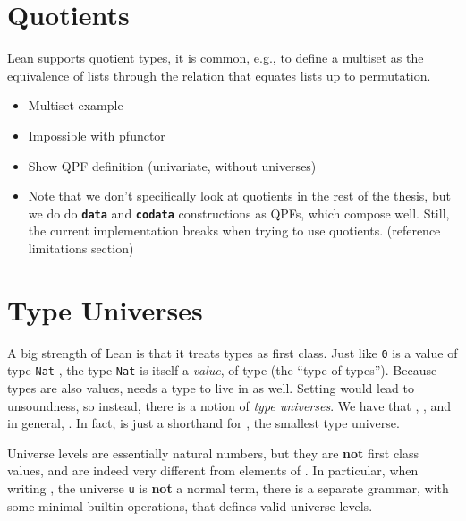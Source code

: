 \documentclass[titlepage]{report}
\newenvironment{todo}{%
\definecolor{shadecolor}{HTML}{F8E0E0}%
\begin{shaded}%
\begin{trivlist}                         
    \item[\hskip \labelsep {\bfseries Todo:}]}{\end{trivlist}\end{shaded}}
\newcommand\lean[1]{{%
\def\leanmode{1}%
\small \texttt{#1}%
\undef\leanmode%
}}
\newcommand\keyword[1]{{\color{keywordcolor} \textbf{\lean{#1}}}}
\newcommand\data{\keyword{data}}
\newcommand\codata{\keyword{codata}}
\newcommand\Type{\leanm{Type}}
\newcommand\Typen[1]{\leanm{Type #1}}
\begin{document}
\section{Quotients}
Lean supports quotient types, it is common, e.g., to define a multiset as the equivalence of lists through the relation that equates lists up to permutation.


\begin{todo}
    \begin{itemize}
        \item Multiset example
        \item Impossible with pfunctor
        \item Show QPF definition (univariate, without universes)
        \item Note that we don't specifically look at quotients in the rest of the thesis, but we do do \data{} and \codata{} constructions as QPFs, which compose well. Still, the current implementation breaks when trying to use quotients. (reference limitations section)
    \end{itemize}
\end{todo}











\section{Type Universes}
\label{sec:bg:universes}

A big strength of Lean is that it treats types as first class. Just like \lean{0} is a value of type \lean{Nat}, the type \lean{Nat} is itself a \emph{value}, of type \Type{} (the ``type of types''). Because types are also values, \Type{} needs a type to live in as well. Setting  would lead to unsoundness, so instead, there is a notion of \emph{type universes}. We have that , , and in general, . In fact,  is just a shorthand for , the smallest type universe.

Universe levels are essentially natural numbers, but they are \textbf{not} first class values, and are indeed very different from elements of .
In particular, when writing \Typen{u}, the universe \lean{u} is \textbf{not} a normal term, there is a separate grammar, with some minimal builtin operations, that defines valid universe levels.
\end{document}
